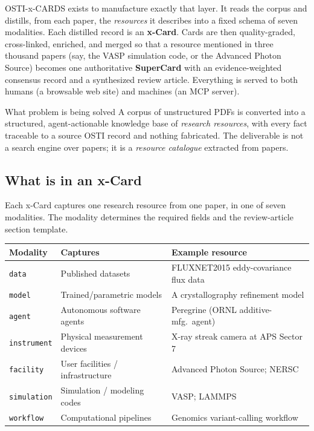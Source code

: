 \documentclass[11pt,letterpaper]{article}
\newcommand{\code}[1]{\texttt{\small #1}}
\begin{document}
OSTI-x-CARDS exists to manufacture exactly that layer. It reads the corpus and
distills, from each paper, the \emph{resources} it describes into a fixed schema of
seven modalities. Each distilled record is an \textbf{x-Card}. Cards are then
quality-graded, cross-linked, enriched, and merged so that a resource mentioned in
three thousand papers (say, the VASP simulation code, or the Advanced Photon Source)
becomes one authoritative \textbf{SuperCard} with an evidence-weighted consensus
record and a synthesized review article. Everything is served to both humans (a
browsable web site) and machines (an MCP server).

\begin{notebox}{What problem is being solved}
A corpus of unstructured PDFs is converted into a structured, agent-actionable
knowledge base of \emph{research resources}, with every fact traceable to a source
OSTI record and nothing fabricated. The deliverable is not a search engine over
papers; it is a \emph{resource catalogue} extracted from papers.
\end{notebox}

\subsection{What is in an x-Card}

Each x-Card captures one research resource from one paper, in one of seven
modalities. The modality determines the required fields and the review-article
section template.

\begin{center}
\small
\begin{tabular}{@{}l l l@{}}
\toprule
\textbf{Modality} & \textbf{Captures} & \textbf{Example resource} \\
\midrule
\code{data}       & Published datasets            & FLUXNET2015 eddy-covariance flux data \\
\code{model}      & Trained/parametric models     & A crystallography refinement model \\
\code{agent}      & Autonomous software agents    & Peregrine (ORNL additive-mfg.\ agent) \\
\code{instrument} & Physical measurement devices  & X-ray streak camera at APS Sector 7 \\
\code{facility}   & User facilities / infrastructure & Advanced Photon Source; NERSC \\
\code{simulation} & Simulation / modeling codes   & VASP; LAMMPS \\
\code{workflow}   & Computational pipelines       & Genomics variant-calling workflow \\
\bottomrule
\end{tabular}
\end{center}
\end{document}
